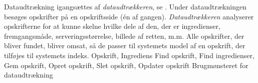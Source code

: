 {Dataudtrækning igangsættes af \textit{dataudtrækkeren}, se . Under dataudtrækningen besøges opskrifter på en opskriftsside (én af gangen). \textit{Dataudtrækkeren} analyserer opskrifterne for at kunne skelne hvilke dele af den, der er ingredienser, fremgangsmåde, serveringsstørrelse, billede af retten, m.m. Alle opskrifter, der bliver fundet, bliver omsat, så de passer til systemets model af en opskrift, der tilføjes til systemets indeks.}
{Opskrift, Ingrediens}
{Find opskrift, Find ingredienser, Gem opskrift, Opret opskrift, Slet opskrift, Opdater opskrift}
{Brugmønsteret for dataudtrækning}
